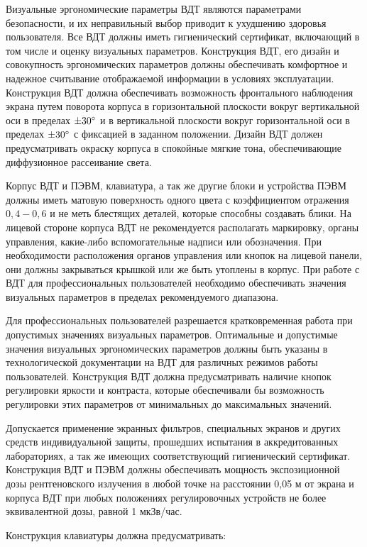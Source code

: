 Визуальные эргономические параметры ВДТ являются параметрами безопасности,
и их неправильный выбор приводит к ухудшению здоровья пользователя. Все ВДТ
должны иметь гигиенический сертификат, включающий в том числе и оценку визуальных
параметров. Конструкция ВДТ, его дизайн и совокупность эргономических параметров
должны обеспечивать комфортное и надежное считывание отображаемой информации в
условиях эксплуатации. Конструкция ВДТ должна обеспечивать возможность фронтального
наблюдения экрана путем поворота корпуса в горизонтальной плоскости вокруг
вертикальной оси в пределах $\pm 30 \degree$ и в вертикальной плоскости вокруг
горизонтальной оси в пределах $\pm 30 \degree$ с фиксацией в заданном положении.
Дизайн ВДТ должен предусматривать окраску корпуса в спокойные мягкие тона,
обеспечивающие диффузионное рассеивание света.

Корпус ВДТ и ПЭВМ, клавиатура, а так же другие блоки и устройства ПЭВМ должны
иметь матовую поверхность одного цвета с коэффициентом отражения $0,4 - 0,6$ и
не меть блестящих деталей, которые способны создавать блики. На лицевой стороне
корпуса ВДТ не рекомендуется располагать маркировку, органы управления, какие-либо вспомогательные надписи или обозначения.
При необходимости расположения органов управления или кнопок на лицевой панели,
они должны закрываться крышкой или же быть утоплены в корпус. При работе с ВДТ
для профессиональных пользователей необходимо обеспечивать значения визуальных
параметров в пределах рекомендуемого диапазона.

Для профессиональных пользователей разрешается кратковременная работа при допустимых
значениях визуальных параметров. Оптимальные и допустимые значения визуальных
эргономических параметров должны быть указаны в технологической документации на
ВДТ для различных режимов работы пользователей. Конструкция ВДТ должна предусматривать
наличие кнопок регулировки яркости и контраста, которые обеспечивали бы возможность
регулировки этих параметров от минимальных до максимальных значений.

Допускается применение экранных фильтров, специальных экранов и других средств
индивидуальной защиты, прошедших испытания в аккредитованных лабораториях, а так
же имеющих соответствующий гигиенический сертификат. Конструкция ВДТ и ПЭВМ должны
обеспечивать мощность экспозиционной дозы рентгеновского излучения в любой точке
на расстоянии 0,05 м от экрана и корпуса ВДТ при любых положениях регулировочных
устройств не более эквивалентной дозы, равной 1 мкЗв/час.

Конструкция клавиатуры должна предусматривать:

